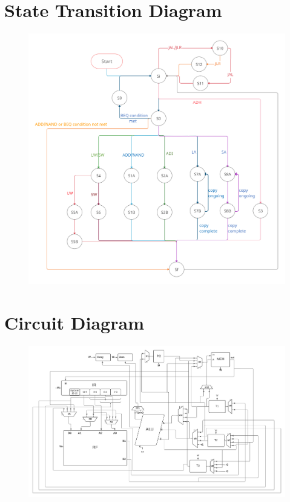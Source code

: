 \documentclass[11pt, fleqn]{article}
\begin{document}
\newpage
\section*{State Transition Diagram}
\begin{figure}[H]
    \centering
    \includegraphics[scale=0.2]{STG.png}
\end{figure}

\newpage
\section*{Circuit Diagram}%
\vspace*{-0.5cm}
\begin{figure}
    \centering
    \includegraphics[scale=0.58]{crd.jpeg}
\end{figure}
\end{document}
